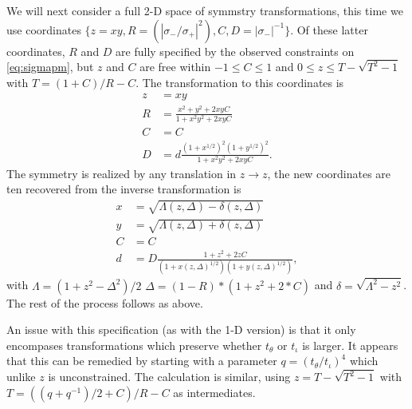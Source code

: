 \documentclass[aps,showpacs,twocolumn,prd,superscriptaddress,nofootinbib]{revtex4}
\begin{document}
We will next consider a full 2-D space of symmstry transformations, this time we use coordinates $\{{z=xy,R=(|\sigma_-/\sigma_+|^2),C,D=|\sigma_-|^{-1}}\}$.  Of these latter coordinates, $R$ and $D$ are fully specified by the observed constraints on \eqref{eq:sigmapm}, but $z$ and $C$ are free within $-1\leq C\leq1$ and $0\leq z\leq T-\sqrt{T^2-1}$ with $T=(1+C)/R-C$. The transformation to this coordinates is
\begin{align}
  z&=xy\\
  R&=\frac{x^2+y^2+2xyC}{1+x^2y^2+2xyC}\\
  C&=C\\
  D&=d\frac{(1+x^{1/2})^2(1+y^{1/2})^2}{1+x^2y^2+2xyC}.
\end{align}
The symmetry is realized by any translation in $z\rightarrow z$, the new coordinates are ten recovered from the inverse transformation is 
\begin{align}
  x&=\sqrt{\Lambda(z,\Delta)-\delta(z,\Delta)}\\
  y&=\sqrt{\Lambda(z,\Delta)+\delta(z,\Delta)}\\
  C&=C\\
  d&=D\frac {1+z^2+2zC}{(1+x(z,\Delta)^{1/2})(1+y(z,\Delta)^{1/2})},
\end{align}
with $\Lambda=(1+z^2-\Delta^2)/2$ $\Delta=(1-R)*(1+z^2+2*C)$ and $\delta=\sqrt{\Lambda^2-z^2}$.
The rest of the process follows as above.

An issue with this specification (as with the 1-D version) is that it only encompases transformations which preserve whether $t_\theta$ or $t_\iota$ is larger.  It appears that this can be remedied by starting with a parameter $q=(t_\theta/t_\iota)^{4}$ which unlike $z$ is unconstrained. The calculation is similar, using $z=T-\sqrt{T^2-1}$ with $T=((q+q^{-1})/2+C)/R-C$ as intermediates.
\end{document}
